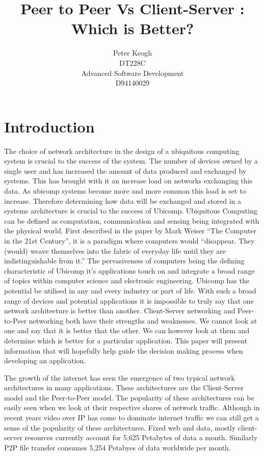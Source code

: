\documentclass[11pt]{amsart}
\title{Peer to Peer Vs Client-Server : Which is Better?}
\author{
Peter Keogh
\\DT228C
\\Advanced Software Development
\\D94140029
}
\date{}
\begin{document}
\maketitle
\tableofcontents

\part{Introduction}

The choice of network architecture in the design of a ubiquitous computing system is crucial to the success of the system. The number of devices owned by a single user and has increased the amount of data produced and exchanged by systems. This has brought with it an increase load on networks exchanging this data. As ubicomp systems become more and more common this load is set to increase. Therefore determining how data will be exchanged and stored in a systems architecture is crucial to the success of Ubicomp. 
\indent
Ubiquitous Computing can be defined as computation, communication and sensing being integrated with the physical world. First described in the paper by Mark Weiser ``The Computer in the 21st Century'', it is a paradigm where computers would ``disappear. They (would) weave themselves into the fabric of everyday life until they are indistinguishable from it.''\cite{Weiser} The pervasiveness of computers being the defining characteristic of Ubicomp it's applications touch on and integrate a broad range of topics within computer science and electronic engineering. Ubicomp has the potential be utilised in any and every industry or part of life. 
\indent
With such a broad range of devices and potential applications it is impossible to truly say that one network architecture is better than another. Client-Server networking and Peer-to-Peer networking both have their strengths and weaknesses. We cannot look at one and say that it is better that the other. We can however look at them and determine which is better for a particular application. This paper will present information that will hopefully help guide the decision making process when developing an application.

\indent The growth of the internet has seen the emergence of two typical network architectures in many applications. These architectures are the Client-Server model and the Peer-to-Peer model. 
\indent The popularity of these architectures can be easily seen when we look at their respective shares of network traffic. Although in recent years video over IP has come to dominate internet traffic we can still get a sense of the popularity of these architectures.  
Fixed web and data, mostly client-server resources currently account for 5,625 Petabytes of data a month. Similarly P2P file transfer consumes 5,254 Petabyes of data worldwide per month.\cite{Cisco}
\end{document}
